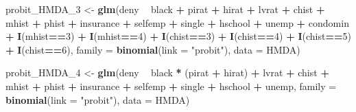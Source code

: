 \documentclass[]{book}
\newenvironment{Shaded}{\begin{snugshade}}{\end{snugshade}}
\newcommand{\KeywordTok}[1]{\textcolor[rgb]{0.13,0.29,0.53}{\textbf{#1}}}
\newcommand{\DataTypeTok}[1]{\textcolor[rgb]{0.13,0.29,0.53}{#1}}
\newcommand{\DecValTok}[1]{\textcolor[rgb]{0.00,0.00,0.81}{#1}}
\newcommand{\StringTok}[1]{\textcolor[rgb]{0.31,0.60,0.02}{#1}}
\newcommand{\OperatorTok}[1]{\textcolor[rgb]{0.81,0.36,0.00}{\textbf{#1}}}
\newcommand{\NormalTok}[1]{#1}
\theoremstyle{definition}
\theoremstyle{definition}
\theoremstyle{definition}
\theoremstyle{remark}
\begin{document}
\begin{Shaded}
\begin{Highlighting}[]
\NormalTok{probit_HMDA_}\DecValTok{3}\NormalTok{ <-}\StringTok{ }\KeywordTok{glm}\NormalTok{(deny }\OperatorTok{~}\StringTok{ }\NormalTok{black }\OperatorTok{+}\StringTok{ }\NormalTok{pirat }\OperatorTok{+}\StringTok{ }\NormalTok{hirat }\OperatorTok{+}\StringTok{ }\NormalTok{lvrat }\OperatorTok{+}\StringTok{ }\NormalTok{chist }\OperatorTok{+}\StringTok{ }\NormalTok{mhist }
                     \OperatorTok{+}\StringTok{ }\NormalTok{phist }\OperatorTok{+}\StringTok{ }\NormalTok{insurance }\OperatorTok{+}\StringTok{ }\NormalTok{selfemp }\OperatorTok{+}\StringTok{ }\NormalTok{single }\OperatorTok{+}\StringTok{ }\NormalTok{hschool }\OperatorTok{+}\StringTok{ }\NormalTok{unemp }\OperatorTok{+}\StringTok{ }\NormalTok{condomin }
                     \OperatorTok{+}\StringTok{ }\KeywordTok{I}\NormalTok{(mhist}\OperatorTok{==}\DecValTok{3}\NormalTok{) }\OperatorTok{+}\StringTok{ }\KeywordTok{I}\NormalTok{(mhist}\OperatorTok{==}\DecValTok{4}\NormalTok{) }\OperatorTok{+}\StringTok{ }\KeywordTok{I}\NormalTok{(chist}\OperatorTok{==}\DecValTok{3}\NormalTok{) }\OperatorTok{+}\StringTok{ }\KeywordTok{I}\NormalTok{(chist}\OperatorTok{==}\DecValTok{4}\NormalTok{) }\OperatorTok{+}\StringTok{ }\KeywordTok{I}\NormalTok{(chist}\OperatorTok{==}\DecValTok{5}\NormalTok{) }
                     \OperatorTok{+}\StringTok{ }\KeywordTok{I}\NormalTok{(chist}\OperatorTok{==}\DecValTok{6}\NormalTok{), }
                     \DataTypeTok{family =} \KeywordTok{binomial}\NormalTok{(}\DataTypeTok{link =} \StringTok{"probit"}\NormalTok{), }
                     \DataTypeTok{data =}\NormalTok{ HMDA)}

\NormalTok{probit_HMDA_}\DecValTok{4}\NormalTok{ <-}\StringTok{ }\KeywordTok{glm}\NormalTok{(deny }\OperatorTok{~}\StringTok{ }\NormalTok{black }\OperatorTok{*}\StringTok{ }\NormalTok{(pirat }\OperatorTok{+}\StringTok{ }\NormalTok{hirat) }\OperatorTok{+}\StringTok{ }\NormalTok{lvrat }\OperatorTok{+}\StringTok{ }\NormalTok{chist }\OperatorTok{+}\StringTok{ }\NormalTok{mhist }\OperatorTok{+}\StringTok{ }\NormalTok{phist }
                     \OperatorTok{+}\StringTok{ }\NormalTok{insurance }\OperatorTok{+}\StringTok{ }\NormalTok{selfemp }\OperatorTok{+}\StringTok{ }\NormalTok{single }\OperatorTok{+}\StringTok{ }\NormalTok{hschool }\OperatorTok{+}\StringTok{ }\NormalTok{unemp, }
                     \DataTypeTok{family =} \KeywordTok{binomial}\NormalTok{(}\DataTypeTok{link =} \StringTok{"probit"}\NormalTok{), }
                     \DataTypeTok{data =}\NormalTok{ HMDA)}
\end{Highlighting}
\end{Shaded}
\end{document}
